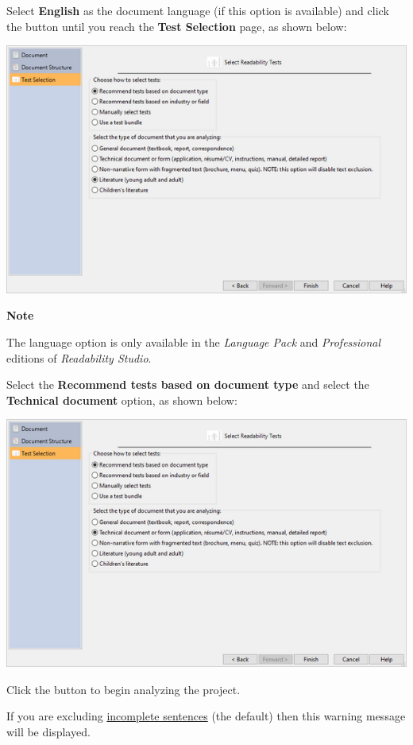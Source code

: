 \documentclass[
]{book}
\newenvironment{notesection}
    {
    \begin{tcolorbox}[colframe=mediumblue,colback=lightblue,coltext=mediumblue,arc=3mm]
    \faLightbulb[regular] \textbf{Note} \newline
    }
    {
    \end{tcolorbox}
    }
\theoremstyle{definition}
\theoremstyle{definition}
\theoremstyle{definition}
\theoremstyle{definition}
\theoremstyle{remark}
\begin{document}
Select \textbf{English} as the document language (if this option is available) and click the  button until you reach the \textbf{Test Selection} page, as shown below:

\includegraphics{Images/wizardreadabilitymethods.png}

\begin{notesection}
The language option is only available in the \emph{Language Pack} and \emph{Professional} editions of \emph{Readability Studio}.

\end{notesection}

Select the \textbf{Recommend tests based on document type} and select the \textbf{Technical document} option, as shown below:

\includegraphics{Images/wizarddoctypetechselected.png}

Click the  button to begin analyzing the project.

If you are excluding \protect\hyperlink{how-text-is-excluded}{incomplete sentences} (the default) then this warning message will be displayed.
\end{document}
